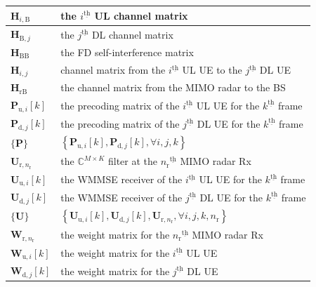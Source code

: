 \documentclass[9pt,journal]{IEEEtran}
\newcommand{\bracket}[1]{{\left [{#1}\right ]}}
\newcommand{\braces}[1]{{\left\{ {#1}\right\}}}
\newcommand{\ith}[1]    {{#1}^{\underline{\text{th}}}}
\newcommand{\rr}{_\mathrm{r}}
\newcommand{\rnr}{_{\mathrm{r},n_\mathrm{r}}}
\newcommand{\MM}{\mathit{M}}
\newcommand{\PiB}{\mathbf{P}_{\textrm{u},i}\bracket{k}}
\newcommand{\PBj}{\mathbf{P}_{\textrm{d},j}\bracket{k}}
\newcommand{\UiB}{\mathbf{U}_{\textrm{u},i}\bracket{k}}
\newcommand{\WiB}{\mathbf{W}_{\textrm{u},i}\bracket{k}}
\newcommand{\UBj}{\mathbf{U}_{\textrm{d},j}\bracket{k}}
\newcommand{\WBj}{\mathbf{W}_{\mathrm{d},j}\bracket{k}}
\newcommand{\Wrnr}{\mathbf{W}_{\mathrm{r},n_\mathrm{r}}}
\newcommand{\HrB}{\mathbf{H}_{\textrm{rB}}}
\newcommand{\HBj}{\mathbf{H}_{\textrm{B},j}}
\newcommand{\HBB}{\mathbf{H}_{\mathrm{BB}}}
\newcommand{\HiB}{\mathbf{H}_{i,\textrm{B}}}
\newcommand{\Hij}{\mathbf{H}_{i,j}}
\begin{document}
\begin{table}[!t]
\begin{tabular}{l||p{66mm}}
			$\HiB$& the $\ith{i}$ UL channel matrix\\
			\hline
			$\HBj$& the $\ith{j}$ DL channel matrix\\
			\hline
			$\HBB$& the FD self-interference matrix\\
			\hline
			$\Hij$& channel matrix from the $\ith{i}$ UL UE to the $\ith{j}$ DL UE\\
			\hline
			$\HrB$& the channel matrix from the MIMO radar to the BS\\
			\hline
			$\PiB$& the precoding matrix of the $\ith{i}$ UL UE for the $\ith{k}$ frame\\
			\hline
			$\PBj$& the precoding matrix of the $\ith{j}$ DL UE for the $\ith{k}$ frame\\
			\hline
			$\{\mathbf{P}\}$& $\braces{\PiB,\PBj,\forall i,j,k}$\\
			\hline
			$\mathbf{U}_{\mathrm{r},n\rr}$& the $\mathbb{C}^{\MM\times\mathrm{\mathit{K}}}$ filter at the $\ith{n\rr}$ MIMO radar Rx\\
			\hline
			$\UiB$& the WMMSE receiver of the $\ith{i}$ UL UE for the $\ith{k}$ frame\\
			\hline
			$\UBj$& the WMMSE receiver of the $\ith{j}$ DL UE for the $\ith{k}$ frame\\
			\hline
			$\{\mathbf{U}\}$& $\braces{\UiB, \UBj, \mathbf{U}\rnr, \forall i,j,k,n\rr}$\\
			\hline
			$\Wrnr$& the weight matrix for the $\ith{n\rr}$ MIMO radar Rx\\
			\hline
			$\WiB$& the weight matrix for the $\ith{i}$ UL UE\\
			\hline
			$\WBj$& the weight matrix for the $\ith{j}$ DL UE\\
			\hline
		\end{tabular}
	\end{table}
\vspace{-1em}
\end{document}
